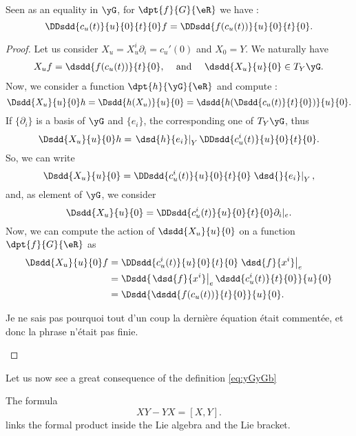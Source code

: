 \begin{lemma}
Seen as an equality in $\yG$, for $\dpt{f}{G}{\eR}$ we have :
\begin{equation}
   \DDsdd{c_u(t)}{u}{0}{t}{0}f=\DDsdd{f(c_u(t))}{u}{0}{t}{0}.
\end{equation}
\end{lemma}

\begin{proof}
Let us consider $X_u=X_u^i\partial_i=c_u'(0)$ and $X_0=Y$. We naturally have
\begin{align}
   X_uf&=\dsdd{f(c_u(t))}{t}{0},&\text{ and } &&\dsdd{X_u}{u}{0}\in T_Y\yG.
\end{align}
Now, we consider a function $\dpt{h}{\yG}{\eR}$ and compute :
\[
  \Dsdd{X_u}{u}{0}h=\Dsdd{h(X_u)}{u}{0}
                   =\dsdd{ h(\Dsdd{c_u(t)}{t}{0}) }{u}{0}.
\]		   
If $\{\partial_i\}$ is a basis of $\yG$ and $\{e_i\}$, the corresponding one of $T_Y\yG$, thus
\begin{equation}
                   \Dsdd{X_u}{u}{0}h=\left.\dsd{h}{e_i}\right|_Y\DDsdd{c^i_u(t)}{u}{0}{t}{0}.
\end{equation}
So, we can write
\[
   \Dsdd{X_u}{u}{0}=\DDsdd{c^i_u(t)}{u}{0}{t}{0}\left.\dsd{}{e_i}\right|_Y,
\]
and, as element of $\yG$, we consider
\[
  \Dsdd{X_u}{u}{0}=\DDsdd{ c^i_u(t) }{u}{0}{t}{0}\partial_i|_e.
\]
Now, we can compute the action of $\dsdd{X_u}{u}{0}$ on a function $\dpt{f}{G}{\eR}$ as
\begin{equation}
\begin{split}
\Dsdd{X_u}{u}{0}f&=\DDsdd{c^i_u(t)}{u}{0}{t}{0}\left.\dsd{f}{x^i}\right|_e\\
                 &=\Dsdd{ \left.\dsd{f}{x^i}\right|_e\dsdd{c^i_u(t)}{t}{0}  }{u}{0}\\
		 &=\Dsdd{ \dsdd{f(c_u(t))}{t}{0} }{u}{0}.
\end{split}
\end{equation}
\begin{probleme}
Je ne sais pas pourquoi tout d'un coup la dernière équation était commentée, et donc la phrase n'était pas finie.
\end{probleme}

\end{proof}

Let us now see a great consequence of the definition \eqref{eq:yGyGb}
\begin{proposition} \label{prop:XY_YX}
The formula
\begin{equation}
   XY-YX=[X,Y].
\end{equation}
links the formal product inside the Lie algebra and the Lie bracket.
\end{proposition}

